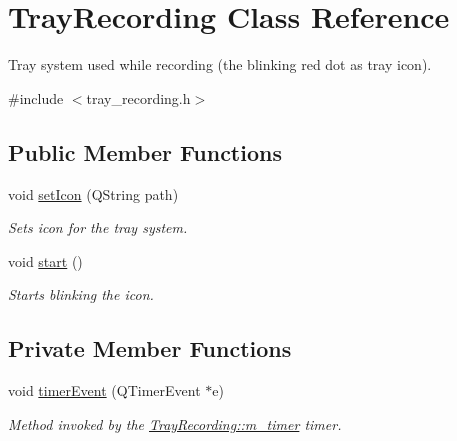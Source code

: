 \hypertarget{class_tray_recording}{\section{Tray\-Recording Class Reference}
\label{class_tray_recording}
}


Tray system used while recording (the blinking red dot as tray icon).  




{\ttfamily \#include $<$tray\-\_\-recording.\-h$>$}

\subsection*{Public Member Functions}
\begin{DoxyCompactItemize}
\item 
void \hyperlink{class_tray_recording_acaf01f9d6e73dc62e35620574aff9f02}{set\-Icon} (Q\-String path)
\begin{DoxyCompactList}\small\item\em Sets icon for the tray system. \end{DoxyCompactList}\item 
void \hyperlink{class_tray_recording_a6ab1598d46e5707e302fb8e3f6a71762}{start} ()
\begin{DoxyCompactList}\small\item\em Starts blinking the icon. \end{DoxyCompactList}\end{DoxyCompactItemize}
\subsection*{Private Member Functions}
\begin{DoxyCompactItemize}
\item 
void \hyperlink{class_tray_recording_a3f2d0de3c0d5894e0a7dacdc5beb2964}{timer\-Event} (Q\-Timer\-Event $\ast$e)
\begin{DoxyCompactList}\small\item\em Method invoked by the \hyperlink{class_tray_recording_a5332c59102a6d37f197c42207a5db0b3}{Tray\-Recording\-::m\-\_\-timer} timer. \end{DoxyCompactList}\end{DoxyCompactItemize}

